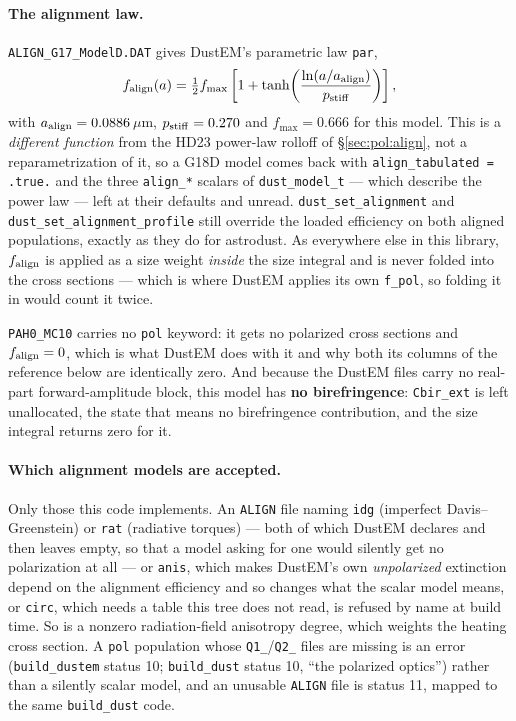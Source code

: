 \documentclass{my_memo}
\newcommand{\code}[1]{\texttt{#1}}
\newcommand{\um}{\ensuremath{\,\mu\mathrm{m}}}
\begin{document}
\paragraph{The alignment law.} \code{ALIGN\_G17\_ModelD.DAT} gives DustEM's
parametric law \code{par},
%
\begin{equation}
  f_{\rm align}(a) = \tfrac{1}{2} f_{\max}
      \left[ 1 + \tanh\!\left( \frac{\ln (a / a_{\rm align})}{p_{\rm stiff}} \right) \right],
  \label{eq:falign-tanh}
\end{equation}
%
with $a_{\rm align} = 0.0886$\um, $p_{\rm stiff} = 0.270$ and
$f_{\max} = 0.666$ for this model. This is a \emph{different function} from the
HD23 power-law rolloff of \S\ref{sec:pol:align}, not a reparametrization of it,
so a G18D model comes back with \code{align\_tabulated = .true.} and the three
\code{align\_*} scalars of \code{dust\_model\_t} --- which describe the power
law --- left at their defaults and unread. \code{dust\_set\_alignment} and
\code{dust\_set\_alignment\_profile} still override the loaded efficiency on
both aligned populations, exactly as they do for astrodust.
As everywhere else in this library, $f_{\rm align}$ is applied as a size weight
\emph{inside} the size integral and is never folded into the cross sections ---
which is where DustEM applies its own \code{f\_pol}, so folding it in would
count it twice.

\code{PAH0\_MC10} carries no \code{pol} keyword: it gets no polarized cross
sections and $f_{\rm align} = 0$, which is what DustEM does with it and why
both its columns of the reference below are identically zero. And because the
DustEM files carry no real-part forward-amplitude block, this model has
\textbf{no birefringence}: \code{Cbir\_ext} is left unallocated, the state that
means no birefringence contribution, and the size integral returns zero for it.

\paragraph{Which alignment models are accepted.} Only those this code
implements. An \code{ALIGN} file naming \code{idg} (imperfect
Davis--Greenstein) or \code{rat} (radiative torques) --- both of which DustEM
declares and then leaves empty, so that a model asking for one would silently
get no polarization at all --- or \code{anis}, which makes DustEM's own
\emph{unpolarized} extinction depend on the alignment efficiency and so changes
what the scalar model means, or \code{circ}, which needs a table this tree does
not read, is refused by name at build time. So is a nonzero radiation-field
anisotropy degree, which weights the heating cross section. A \code{pol}
population whose \code{Q1\_}/\code{Q2\_} files are missing is an error
(\code{build\_dustem} status 10; \code{build\_dust} status 10, ``the polarized
optics'') rather than a silently scalar model, and an unusable \code{ALIGN}
file is status 11, mapped to the same \code{build\_dust} code.
\end{document}
